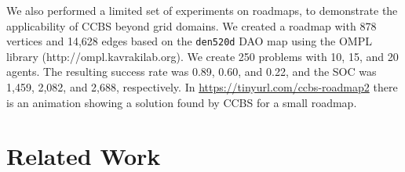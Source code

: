 \documentclass[review]{elsarticle}
\newcommand{\commentout}[1]{ }
\newcommand{\ccbs}{\ac{CCBS}\xspace}
\begin{document}
\commentout{
\begin{figure}
    \centering
    \texttt{[image: roadmap\_cropped.pdf]}
    \caption{The roadmap created for \texttt{den520d} DAO map.}
    \label{fig:roadmap}
\end{figure}
}
We also performed a limited set of experiments on roadmaps, to demonstrate the applicability of \ccbs beyond grid domains. 
We created a roadmap with 878 vertices and 14,628 edges based on the \texttt{den520d} DAO map using the OMPL library (http://ompl.kavrakilab.org). 
We create 250 problems with 10, 15, and 20 agents. The resulting success rate was 0.89, 0.60, and 0.22, 
and the SOC was 1,459, 2,082, and 2,688, respectively. 
In \url{https://tinyurl.com/ccbs-roadmap2} there is an animation showing a solution found by \ccbs for a small roadmap. 



\section{Related Work}
\label{sec:related-work}


\end{document}
